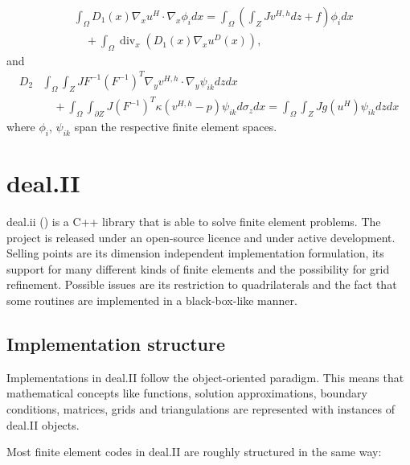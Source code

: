 \documentclass{article}
\newcommand{\boundaryz}{\partial Z}
\renewcommand{\div}{\operatorname{div}}
\begin{document}
\begin{equation}
    \label{eq:discrete_weak_macro}
    \begin{split}
        &\int_\Omega D_1(x)\nabla_x u^H \cdot \nabla_x \phi_i dx = \int_\Omega \left( \int_{Z} Jv^{H,h}dz + f \right)\phi_i dx \\
        &\quad + \int_\Omega \div_x \left( D_1(x) \nabla_x u^D(x) \right),
    \end{split}
\end{equation}
and
\begin{equation}
    \label{eq:discrete_weak_micro}
    \begin{split}
        D_2 &\int_\Omega\int_{Z} JF^{-1}(F^{-1})^{T} \nabla_y v^{H,h} \cdot \nabla_y \psi_{ik} dz dx \\
        & \quad + \int_\Omega\int_{\boundaryz} J (F^{-1})^T \kappa (v^{H,h} - p) \psi_{ik} d\sigma_z dx
        = \int_\Omega \int_{Z} J g(u^{H}) \psi_{ik} dz dx
    \end{split}
\end{equation}
where $\phi_i$, $\psi_{ik}$ span the respective finite element spaces.
\section{deal.II}
\label{sec:dealii}

deal.ii (\cite{dealii}) is a C++ library that is able to solve finite element problems. The project is released under an open-source licence and under active development. Selling points are its dimension independent implementation formulation, its support for many different kinds of finite elements and the possibility for grid refinement. Possible issues are its restriction to quadrilaterals and the fact that some routines are implemented in a black-box-like manner.

\subsection{Implementation structure}
Implementations in deal.II follow the object-oriented paradigm. This means that mathematical concepts like functions, solution approximations, boundary conditions, matrices, grids and triangulations are represented with instances of deal.II objects.

Most finite element codes in deal.II are roughly structured in the same way:
\end{document}
